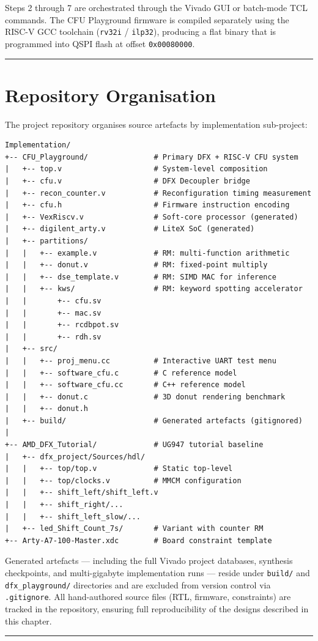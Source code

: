 Steps 2 through 7 are orchestrated through the Vivado GUI or batch-mode TCL commands. The CFU Playground firmware is compiled separately using the RISC-V GCC toolchain (\texttt{rv32i} / \texttt{ilp32}), producing a flat binary that is programmed into QSPI flash at offset \texttt{0x00080000}.

\vspace{0.4em}\hrule\vspace{0.4em}

\section{Repository Organisation}

The project repository organises source artefacts by implementation sub-project:

\begin{lstlisting}[style=mystyle]
Implementation/
+-- CFU_Playground/               # Primary DFX + RISC-V CFU system
|   +-- top.v                     # System-level composition
|   +-- cfu.v                     # DFX Decoupler bridge
|   +-- recon_counter.v           # Reconfiguration timing measurement
|   +-- cfu.h                     # Firmware instruction encoding
|   +-- VexRiscv.v                # Soft-core processor (generated)
|   +-- digilent_arty.v           # LiteX SoC (generated)
|   +-- partitions/
|   |   +-- example.v             # RM: multi-function arithmetic
|   |   +-- donut.v               # RM: fixed-point multiply
|   |   +-- dse_template.v        # RM: SIMD MAC for inference
|   |   +-- kws/                  # RM: keyword spotting accelerator
|   |       +-- cfu.sv
|   |       +-- mac.sv
|   |       +-- rcdbpot.sv
|   |       +-- rdh.sv
|   +-- src/
|   |   +-- proj_menu.cc          # Interactive UART test menu
|   |   +-- software_cfu.c        # C reference model
|   |   +-- software_cfu.cc       # C++ reference model
|   |   +-- donut.c               # 3D donut rendering benchmark
|   |   +-- donut.h
|   +-- build/                    # Generated artefacts (gitignored)
|
+-- AMD_DFX_Tutorial/             # UG947 tutorial baseline
|   +-- dfx_project/Sources/hdl/
|   |   +-- top/top.v             # Static top-level
|   |   +-- top/clocks.v          # MMCM configuration
|   |   +-- shift_left/shift_left.v
|   |   +-- shift_right/...
|   |   +-- shift_left_slow/...
|   +-- led_Shift_Count_7s/       # Variant with counter RM
+-- Arty-A7-100-Master.xdc        # Board constraint template
\end{lstlisting}

Generated artefacts — including the full Vivado project databases, synthesis checkpoints, and multi-gigabyte implementation runs — reside under \texttt{build/} and \texttt{dfx\_playground/} directories and are excluded from version control via \texttt{.gitignore}. All hand-authored source files (RTL, firmware, constraints) are tracked in the repository, ensuring full reproducibility of the designs described in this chapter.

\vspace{0.4em}\hrule\vspace{0.4em}
